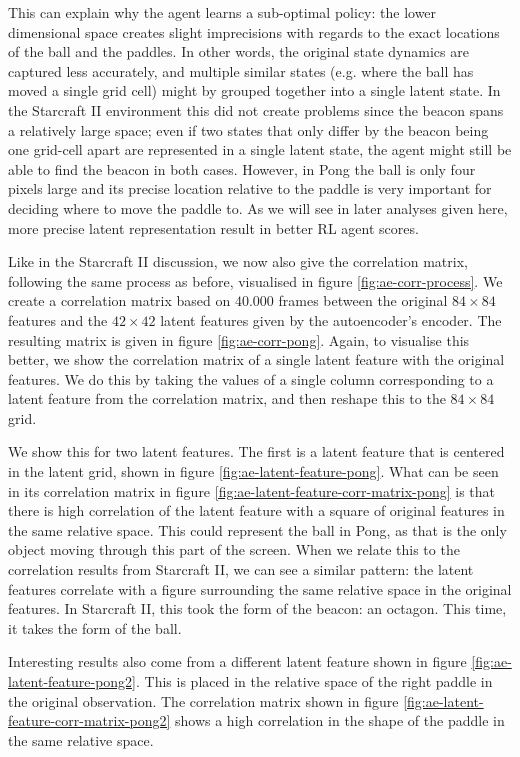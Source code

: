 This can explain why the agent learns a sub-optimal policy: the lower dimensional space creates slight imprecisions with regards to the exact locations of the ball and the paddles. In other words, the original state dynamics are captured less accurately, and multiple similar states (e.g. where the ball has moved a single grid cell) might by grouped together into a single latent state. In the Starcraft II environment this did not create problems since the beacon spans a relatively large space; even if two states that only differ by the beacon being one grid-cell apart are represented in a single latent state, the agent might still be able to find the beacon in both cases. However, in Pong the ball is only four pixels large and its precise location relative to the paddle is very important for deciding where to move the paddle to. As we will see in later analyses given here, more precise latent representation result in better RL agent scores.

Like in the Starcraft II discussion, we now also give the correlation matrix, following the same process as before, visualised in figure \ref{fig:ae-corr-process}. We create a correlation matrix based on $40.000$ frames between the original $84 \times 84$ features and the $42 \times 42$ latent features given by the autoencoder's encoder. The resulting matrix is given in figure \ref{fig:ae-corr-pong}. Again, to visualise this better, we show the correlation matrix of a single latent feature with the original features. We do this by taking the values of a single column corresponding to a latent feature from the correlation matrix, and then reshape this to the $84 \times 84$ grid.

We show this for two latent features. The first is a latent feature that is centered in the latent grid, shown in figure \ref{fig:ae-latent-feature-pong}. What can be seen in its correlation matrix in figure \ref{fig:ae-latent-feature-corr-matrix-pong} is that there is high correlation of the latent feature with a square of original features in the same relative space. This could represent the ball in Pong, as that is the only object moving through this part of the screen. When we relate this to the correlation results from Starcraft II, we can see a similar pattern: the latent features correlate with a figure surrounding the same relative space in the original features. In Starcraft II, this took the form of the beacon: an octagon. This time, it takes the form of the ball.

Interesting results also come from a different latent feature shown in figure \ref{fig:ae-latent-feature-pong2}. This is placed in the relative space of the right paddle in the original observation. The correlation matrix shown in figure \ref{fig:ae-latent-feature-corr-matrix-pong2} shows a high correlation in the shape of the paddle in the same relative space.

